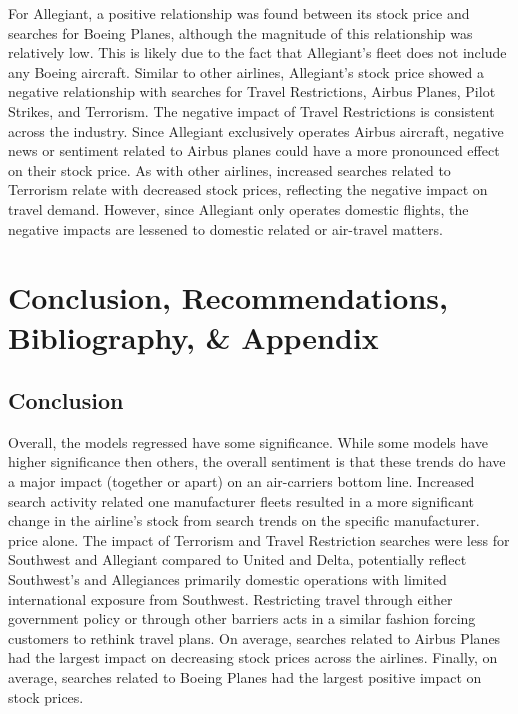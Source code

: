 \documentclass[12pt]{report}
\begin{document}
For Allegiant, a positive relationship was found between its
stock price and searches for Boeing Planes, although the magnitude
of this relationship was relatively low. This is likely due to the fact that
Allegiant's fleet does not include any Boeing aircraft. Similar to other airlines, Allegiant's stock
price showed a negative relationship with searches for Travel
Restrictions, Airbus Planes, Pilot Strikes, and
Terrorism. The negative impact of Travel Restrictions
is consistent across the industry. Since Allegiant exclusively operates Airbus aircraft, negative news or sentiment
related to Airbus planes could have a more pronounced effect on their stock
price. As with other airlines, increased
searches related to Terrorism relate with decreased stock
prices, reflecting the negative impact on travel demand.
However, since Allegiant only operates domestic flights, the negative impacts are lessened to domestic related or air-travel matters.





\newpage







\chapter*{Conclusion, Recommendations, Bibliography, \& Appendix}
\section*{Conclusion}
Overall, the models regressed have some significance.
While some models have higher significance then others, the overall sentiment is that these trends do have a major impact (together or apart)
on an air-carriers bottom line.
Increased search activity related one manufacturer fleets resulted in a more significant change in the airline's stock from search trends on the specific manufacturer.
price alone.
The impact of Terrorism and Travel Restriction searches were
less for Southwest and Allegiant compared to United and Delta, potentially
reflect Southwest's and Allegiances primarily domestic operations with limited international
exposure from Southwest. Restricting travel through either government policy or through other barriers acts in a similar fashion forcing customers to rethink travel plans. On average, searches related to Airbus Planes had the largest impact on decreasing stock prices across the airlines.
Finally, on average, searches related to Boeing Planes had the largest positive impact on stock prices.
\vspace{3cm}
\end{document}
